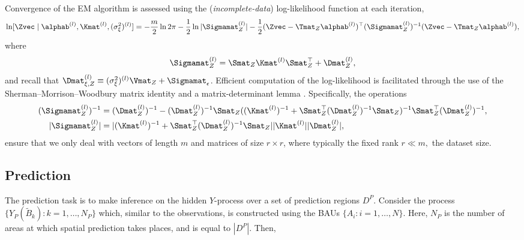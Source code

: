 Convergence of the EM algorithm is assessed using the (\emph{incomplete-data}) log-likelihood function at each iteration,
\begin{equation*}
\ln [\Zvec \mid \alphab^{(l)}, \Kmat^{(l)}, (\sigma^2_\xi)^{(l)}] = -\frac{m}{2}\ln 2\pi -\frac{1}{2}\ln |\Sigmamat_Z^{(l)}| - \frac{1}{2}(\Zvec - \Tmat_Z\alphab^{(l)})^\top(\Sigmamat_Z^{(l)})^{-1}(\Zvec - \Tmat_Z\alphab^{(l)}),
\end{equation*}
where
\begin{equation*}
\Sigmamat_Z^{(l)} = \Smat_Z \Kmat^{(l)} \Smat_Z^\top + \Dmat_Z^{(l)},
\end{equation*}
and recall that $\Dmat_{\xi,Z}^{(l)} \equiv (\sigma_\xi^2)^{(l)}\Vmat_Z + \Sigmamat_\epsilon$. Efficient computation of the log-likelihood is facilitated through the use of the Sherman--Morrison--Woodbury matrix identity and a matrix-determinant lemma \citep[e.g.,][]{Henderson_1981}. Specifically, the operations
\begin{align*}
(\Sigmamat_Z^{(l)})^{-1} &= (\Dmat_Z^{(l)})^{-1} - (\Dmat_Z^{(l)})^{-1} \Smat_Z ((\Kmat^{(l)})^{-1} + \Smat^\top_Z (\Dmat_Z^{(l)})^{-1}\Smat_Z)^{-1}\Smat_Z^\top(\Dmat_Z^{(l)})^{-1},\\
| \Sigmamat_Z^{(l)}  | &= | (\Kmat^{(l)})^{-1} + \Smat_Z^\top(\Dmat_Z^{(l)})^{-1} \Smat_Z | |\Kmat^{(l)} | |\Dmat_Z^{(l)} |,%
\end{align*}
ensure that we only deal with vectors of length $m$ and matrices of size $r \times r$, where typically the fixed rank $r \ll m,$ the dataset size.


\subsection{Prediction} \label{sec:prediction}

The prediction task is to make inference on the hidden $Y$-process over a set of prediction regions $D^P$. Consider the process $\{Y_P(\tilde{B}_k): k = 1,\dots,N_P\}$ which, similar to the observations, is constructed using the BAUs $\{A_i: i = 1,\dots,N\}$. Here, $N_P$ is the number of areas at which spatial prediction takes places, and is equal to $|D^P|$. Then,

